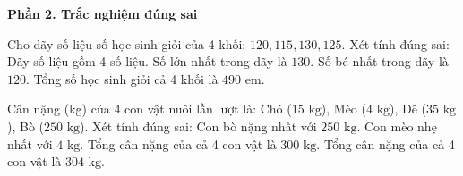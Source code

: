 \textbf{Phần 2. Trắc nghiệm đúng sai}

\begin{ex} %
Cho dãy số liệu số học sinh giỏi của 4 khối: $120, 115, 130, 125$. Xét tính đúng sai:
\choiceTF
{\True Dãy số liệu gồm 4 số liệu.}
{\True Số lớn nhất trong dãy là $130$.}
{Số bé nhất trong dãy là $120$.}
{\True Tổng số học sinh giỏi cả 4 khối là $490$ em.}
\end{ex}

\begin{ex} %
Cân nặng (kg) của 4 con vật nuôi lần lượt là: Chó ($15\text{ kg}$), Mèo ($4\text{ kg}$), Dê ($35\text{ kg}$), Bò ($250\text{ kg}$). Xét tính đúng sai:
\choiceTF
{\True Con bò nặng nhất với $250\text{ kg}$.}
{\True Con mèo nhẹ nhất với $4\text{ kg}$.}
{Tổng cân nặng của cả 4 con vật là $300\text{ kg}$.}
{\True Tổng cân nặng của cả 4 con vật là $304\text{ kg}$.}
\end{ex}

